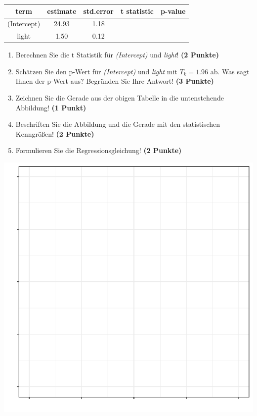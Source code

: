 \documentclass[a4paper, 10pt]{scrartcl}\usepackage[]{graphicx}\usepackage[]{xcolor}
\makeatletter
\def\maxwidth{ %
  \ifdim\Gin@nat@width>\linewidth
    \linewidth
  \else
    \Gin@nat@width
  \fi
}
\makeatother
\begin{document}
\begin{table}[!h]
\centering\begingroup\fontsize{14}{16}\selectfont

\begin{tabular}{ccccc}
\toprule
term & estimate & std.error & t statistic & p-value\\
\midrule
(Intercept) & 24.93 & 1.18 &  & \\
light & 1.50 & 0.12 &  & \\
\bottomrule
\end{tabular}
\endgroup{}
\end{table}



\begin{enumerate}
\item Berechnen Sie die t Statistik f{\"u}r \textit{(Intercept)} und
  \textit{light}! \textbf{(2 Punkte)}
\item Sch{\"a}tzen Sie den p-Wert f{\"u}r \textit{(Intercept)} und
  \textit{light} mit $T_k = 1.96$ ab. Was sagt Ihnen der p-Wert aus?
  Begr{\"u}nden Sie Ihre Antwort! \textbf{(3 Punkte)}
\item Zeichnen Sie die Gerade aus der obigen Tabelle in die untenstehende
  Abbildung! \textbf{(1 Punkt)}
\item Beschriften Sie die Abbildung und die Gerade mit den statistischen
  Kenngr{\"o}{\ss}en! \textbf{(2 Punkte)}
\item Formulieren Sie die Regressionsgleichung! \textbf{(2 Punkte)}
\end{enumerate}



{\centering \includegraphics[width=\maxwidth]{img/regression-02-b-1} 

}
\end{document}
